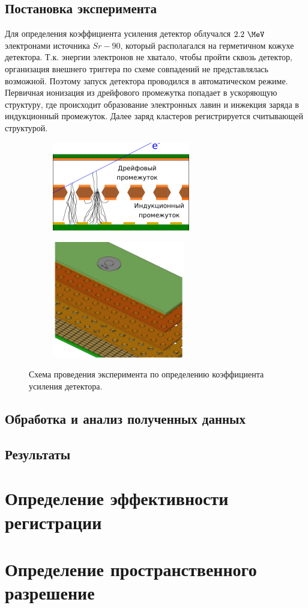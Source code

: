 \subsection{Постановка эксперимента}
Для определения коэффициента усиления детектор облучался $2.2~\MeV$ электронами источника $Sr-90$, который располагался на герметичном кожухе детектора. Т.к. энергии электронов не хватало, чтобы пройти сквозь детектор, организация внешнего триггера по схеме совпадений не представлялась возможной. Поэтому запуск детектора проводился в автоматическом режиме. Первичная ионизация из дрейфового промежутка попадает в ускоряющую структуру, где происходит образование электронных лавин и инжекция заряда в индукционный промежуток. Далее заряд кластеров регистрируется считывающей структурой. 
\begin{figure}[H]
	\centering
	\begin{subfigure}{.5\textwidth}
		\centering
		\includegraphics[height = 4 cm, width= 6cm]{img/GEM_scheme.pdf}
		\caption{}
		\label{fig:ionization_scheme}
	\end{subfigure}%
	\begin{subfigure}{.5\textwidth}
		\centering
		\includegraphics[height = 4 cm, width= 5.8cm]{img/GEM_Sr_source.pdf}
		\caption{}
		\label{fig:det_scheme+sr90}
	\end{subfigure}
	\caption{Схема проведения эксперимента по определению коэффициента усиления детектора.}
	\label{fig:ampl_exp}
\end{figure}

\subsection{Обработка и анализ полученных данных}

\subsection{Результаты}
\section{Определение эффективности регистрации}
\section{Определение пространственного разрешение}